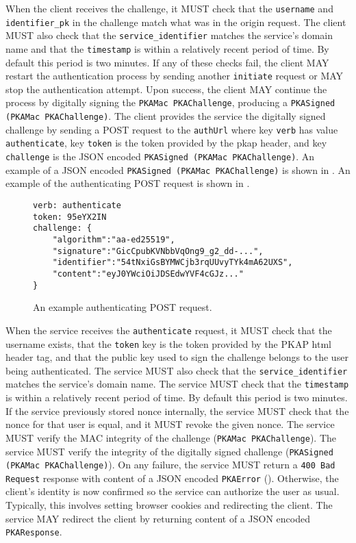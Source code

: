 \documentclass{article}
\newcommand{\pkap}{PKAP}
\begin{document}

When the client receives the challenge, it MUST check that the \texttt{username} and \texttt{identifier\_pk} in the challenge match what was in the origin request. 
The client MUST also check that the \texttt{service\_identifier} matches the service's domain name and that the \texttt{timestamp} is within a relatively recent period of time. 
By default this period is two minutes. 
If any of these checks fail, the client MAY restart the authentication process by sending another \texttt{initiate} request or MAY stop the authentication attempt. 
Upon success, the client MAY continue the process by digitally signing the \texttt{PKAMac PKAChallenge}, producing a \texttt{PKASigned (PKAMac PKAChallenge)}. 
The client provides the service the digitally signed challenge by sending a POST request to the \texttt{authUrl} where key \texttt{verb} has value \texttt{authenticate}, key \texttt{token} is the token provided by the pkap header, and key \texttt{challenge} is the JSON encoded \texttt{PKASigned (PKAMac PKAChallenge)}. 
An example of a JSON encoded \texttt{PKASigned (PKAMac PKAChallenge)} is shown in . 
An example of the authenticating POST request is shown in . 

\begin{figure}
\begin{lstlisting}
verb: authenticate
token: 95eYX2IN
challenge: {
    "algorithm":"aa-ed25519",
    "signature":"GicCpubKVNbbVqOng9_g2_dd-...",
    "identifier":"54tNxiGsBYMWCjb3rqUUvyTYk4mA62UXS",
    "content":"eyJ0YWciOiJDSEdwYVF4cGJz..."
}
\end{lstlisting}
\caption{An example authenticating POST request.}
\label{code:postauthenticate}
\end{figure}

When the service receives the \texttt{authenticate} request, it MUST check that the username exists, that the \texttt{token} key is the token provided by the \pkap{} html header tag,  and that the public key used to sign the challenge belongs to the user being authenticated. 
The service MUST also check that the \texttt{service\_identifier} matches the service's domain name. 
The service MUST check that the \texttt{timestamp} is within a relatively recent period of time. 
By default this period is two minutes. 
If the service previously stored nonce internally, the service MUST check that the nonce for that user is equal, and it MUST revoke the given nonce. 
The service MUST verify the MAC integrity of the challenge (\texttt{PKAMac PKAChallenge}). 
The service MUST verify the integrity of the digitally signed challenge (\texttt{PKASigned (PKAMac PKAChallenge)}). 
On any failure, the service MUST return a \texttt{400 Bad Request} response with content of a JSON encoded \texttt{PKAError} (). 
Otherwise, the client's identity is now confirmed so the service can authorize the user as usual. 
Typically, this involves setting browser cookies and redirecting the client. 
The service MAY redirect the client by returning content of a JSON encoded \texttt{PKAResponse}. 
\end{document}
